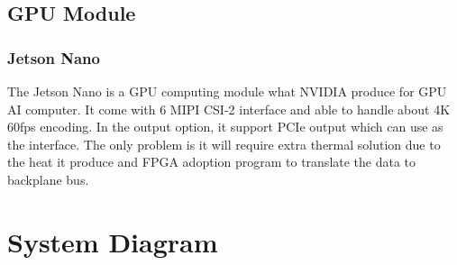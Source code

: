 \documentclass[12pt,article]{memoir}
\begin{document}
\section{GPU Module}
\subsection{Jetson Nano}
The Jetson Nano is a GPU computing module what NVIDIA produce for GPU AI computer. It come with 6 MIPI CSI-2 interface and able to handle about 4K 60fps encoding. In the output option, it support PCIe output which can use as the interface. The only problem is it will require extra thermal solution due to the heat it produce and FPGA adoption program to translate the data to backplane bus.\cite{nv:JetsonNano}

\newpage

\chapter{System Diagram}
\end{document}
